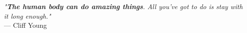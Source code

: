 
\begin{flushright}
    \emph{"\textbf{The human body can do amazing things}. All you’ve got to do is stay with it long enough."}\\
    --- Cliff Young
\end{flushright}